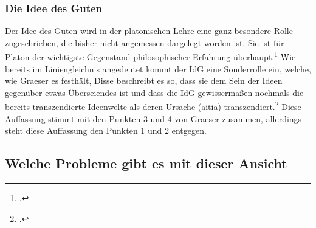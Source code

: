 \subsubsection{Die Idee des Guten}
Der Idee des Guten wird in der platonischen Lehre eine ganz besondere Rolle zugeschrieben, die bisher nicht angemessen dargelegt worden ist. Sie ist  für Platon der wichtigste Gegenstand philosophischer Erfahrung überhaupt.\footcite[vgl.][S. 158]{GraeserPhiloGeschichte}
Wie bereits im Liniengleichnis angedeutet kommt der IdG eine Sonderrolle ein, welche, wie Graeser es festhält, 
Disse beschreibt es so, dass sie dem Sein der Ideen gegenüber etwas Überseiendes ist und dass die IdG gewissermaßen nochmals die bereits transzendierte Ideenwelte als deren Ursache (aitia) transzendiert.\footcite[vgl.][S. 50]{DisseMetaphysik}
Diese Auffassung stimmt mit den Punkten 3 und 4 von Graeser zusammen, allerdings steht diese Auffassung den Punkten 1 und 2 entgegen. 


\subsection{Welche Probleme gibt es mit dieser Ansicht}
